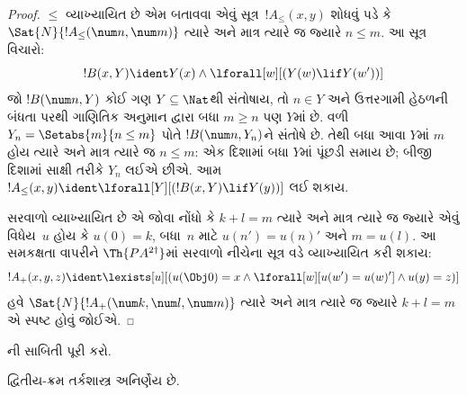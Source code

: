 \begin{proof}
$\le$ વ્યાખ્યાયિત છે એમ બતાવવા એવું સૂત્ર~$!A_\le(x, y)$ શોધવું
પડે કે $\Sat{N}{!A_\le(\num n, \num m)}$ ત્યારે અને માત્ર ત્યારે જ
જ્યારે $n \le m$. આ સૂત્ર વિચારો:
\[
!B(x, Y) \ident Y(x) \land \lforall[w][(Y(w) \lif Y(w'))]
\]
જો $!B(\num n, Y)$ કોઈ ગણ $Y \subseteq \Nat$થી સંતોષાય, તો
$n\in Y$ અને ઉત્તરગામી હેઠળની બંધતા પરથી ગાણિતિક અનુમાન દ્વારા
બધા $m\ge n$ પણ $Y$માં છે. વળી $Y_n=\Setabs{m}{n\le m}$ પોતે
$!B(\num n,Y_n)$ને સંતોષે છે. તેથી બધા આવા $Y$માં $m$ હોય
ત્યારે અને માત્ર ત્યારે જ $n\le m$: એક દિશામાં બધા $Y$માં પૂંછડી
સમાય છે; બીજી દિશામાં સાક્ષી તરીકે $Y_n$ લઈએ છીએ.
આમ $!A_\le(x, y) \ident
\lforall[Y][(!B(x, Y) \lif Y(y))]$ લઈ શકાય.

સરવાળો વ્યાખ્યાયિત છે એ જોવા નોંધો કે $k+l=m$ ત્યારે અને માત્ર ત્યારે
જ જ્યારે એવું વિધેય~$u$ હોય કે $u(0)=k$, બધા~$n$ માટે
$u(n')=u(n)'$ અને $m = u(l)$. આ સમકક્ષતા વાપરીને
$\Th{PA^{2\dagger}}$માં સરવાળો નીચેના સૂત્ર વડે વ્યાખ્યાયિત કરી
શકાય:
\[
!A_+(x,y,z) \ident \lexists[u][(u(\Obj 0)=x \land \lforall[w][u(w')=u
 (w)'] \land u(y)=z)]
\]
હવે $\Sat{N}{!A_+(\num k, \num l, \num m)}$ ત્યારે અને માત્ર
ત્યારે જ જ્યારે $k+l=m$ એ સ્પષ્ટ હોવું જોઈએ.
\end{proof}

\begin{prob}
ની સાબિતી પૂરી કરો.
\end{prob}
\endgroup


\begingroup
\makeatletter{}\makeatother


\label{guunit:OLP-0333}



\begin{thm}
દ્વિતીય-ક્રમ તર્કશાસ્ત્ર અનિર્ણેય છે.
\end{thm}


